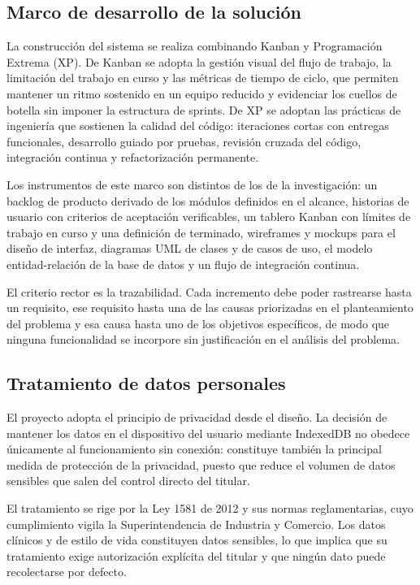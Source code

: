 \documentclass[conference]{IEEEtran}
\begin{document}
\subsection{Marco de desarrollo de la solución}
La construcción del sistema se realiza combinando Kanban y Programación Extrema (XP). De Kanban se adopta la gestión visual del flujo de trabajo, la limitación del trabajo en curso y las métricas de tiempo de ciclo, que permiten mantener un ritmo sostenido en un equipo reducido y evidenciar los cuellos de botella sin imponer la estructura de sprints. De XP se adoptan las prácticas de ingeniería que sostienen la calidad del código: iteraciones cortas con entregas funcionales, desarrollo guiado por pruebas, revisión cruzada del código, integración continua y refactorización permanente.

Los instrumentos de este marco son distintos de los de la investigación: un backlog de producto derivado de los módulos definidos en el alcance, historias de usuario con criterios de aceptación verificables, un tablero Kanban con límites de trabajo en curso y una definición de terminado, wireframes y mockups para el diseño de interfaz, diagramas UML de clases y de casos de uso, el modelo entidad-relación de la base de datos y un flujo de integración continua.

El criterio rector es la trazabilidad. Cada incremento debe poder rastrearse hasta un requisito, ese requisito hasta una de las causas priorizadas en el planteamiento del problema y esa causa hasta uno de los objetivos específicos, de modo que ninguna funcionalidad se incorpore sin justificación en el análisis del problema.

\subsection{Tratamiento de datos personales}
El proyecto adopta el principio de privacidad desde el diseño. La decisión de mantener los datos en el dispositivo del usuario mediante IndexedDB no obedece únicamente al funcionamiento sin conexión: constituye también la principal medida de protección de la privacidad, puesto que reduce el volumen de datos sensibles que salen del control directo del titular.

El tratamiento se rige por la Ley 1581 de 2012 y sus normas reglamentarias, cuyo cumplimiento vigila la Superintendencia de Industria y Comercio. Los datos clínicos y de estilo de vida constituyen datos sensibles, lo que implica que su tratamiento exige autorización explícita del titular y que ningún dato puede recolectarse por defecto.
\end{document}
